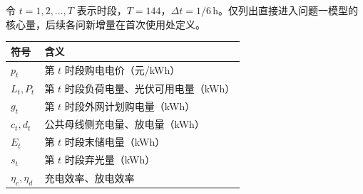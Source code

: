 令 $t=1,2,\ldots,T$ 表示时段，$T=144$，$\Delta t=1/6\,\mathrm{h}$。仅列出直接进入问题一模型的核心量，后续各问新增量在首次使用处定义。
\begin{center}
\begin{tabularx}{0.94\linewidth}{@{}lL@{}}
\toprule
符号 & 含义 \\
\midrule
$p_t$ & 第 $t$ 时段购电电价（元/kWh） \\
$L_t,P_t$ & 第 $t$ 时段负荷电量、光伏可用电量（kWh） \\
$g_t$ & 第 $t$ 时段外网计划购电量（kWh） \\
$c_t,d_t$ & 公共母线侧充电量、放电量（kWh） \\
$E_t$ & 第 $t$ 时段末储电量（kWh） \\
$s_t$ & 第 $t$ 时段弃光量（kWh） \\
$\eta_c,\eta_d$ & 充电效率、放电效率 \\
\bottomrule
\end{tabularx}
\end{center}
